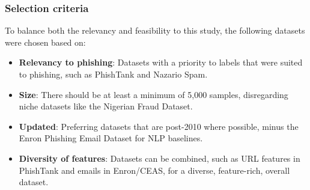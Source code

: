 
\subsubsection*{Selection criteria} 
To balance both the relevancy and feasibility to this study, the following datasets were chosen based on:

\begin{itemize}
  \item \textbf{Relevancy to phishing}: Datasets with a priority to labels that were suited to phishing, such as PhishTank and Nazario Spam.
  \item \textbf{Size}: There should be at least a minimum of 5,000 samples, disregarding niche datasets like the Nigerian Fraud Dataset.
  \item \textbf{Updated}: Preferring datasets that are post-2010 where possible, minus the Enron Phishing Email Dataset for NLP baselines.
  \item \textbf{Diversity of features}: Datasets can be combined, such as URL features in PhishTank and emails in Enron/CEAS, for a diverse, feature-rich, overall dataset.
\end{itemize}
